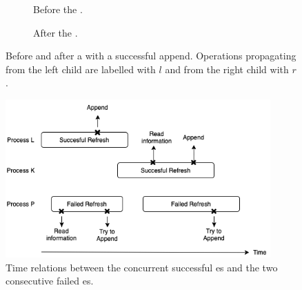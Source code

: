 \begin{figure}[hbtp]
\begin{center}
\hspace{6em}\begin{subfigure}[b]{.29\textwidth}
  \centering
  \resizebox{\columnwidth}{!}{
  \begin{tikzpicture}[level 1/.style={level distance=1.2cm,sibling distance=0.5cm}]
\Tree [.$r_1,l_1,l_2,r_2,l_3$
$l_1,l_2,l_3,l_4,l_5$
$r_1,r_2,r_3,r_4$ ]
\end{tikzpicture}}
  \caption{Before the .}
\end{subfigure}
\hfill
\begin{subfigure}[b]{.29\textwidth}
  \centering
  \resizebox{\columnwidth}{!}{
  \begin{tikzpicture}[level 1/.style={level distance=1.2cm,sibling distance=0.5cm}]
\Tree [.$r_1,l_1,l_2,r_2,l_3,l_4,l_5,r_3,r_4$
$l_1,l_2,l_3,l_4,l_5$
$r_1,r_2,r_3,r_4$ ]
\end{tikzpicture}}
  \caption{After the .}
\end{subfigure}
\hspace{6em}
\caption[A successful .]{\label{fig::propagstep} Before
  and after a  with a successful append. Operations
  propagating from the left child are labelled with $l$ and from the
  right child with $r$.} 
\end{center}
\end{figure}

\begin{figure}[hbpt]
  \center\includegraphics[width=4in]{pics/doublyrefresh-drawio.png}
  \caption[Two consecutive failed es by a
    process.]{\label{fig::simpleDoubleRefresh}Time relations between
    the concurrent successful es and the two consecutive
    failed es.} 
\end{figure}

